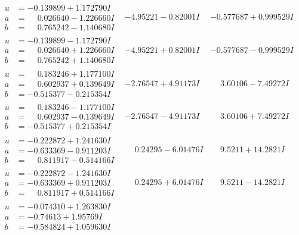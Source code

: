 \documentclass[1p]{elsarticle_modified}
\theoremstyle{definition}
\begin{document}
$$\begin{array}{c|c|c}
\begin{aligned}
u &= -0.139899 + 1.172790 I \\
a &= \phantom{-}0.026640 - 1.226660 I \\
b &= \phantom{-}0.765242 - 1.140680 I\end{aligned}
 & -4.95221 - 0.82001 I & -0.577687 + 0.999529 I \\ \hline\begin{aligned}
u &= -0.139899 - 1.172790 I \\
a &= \phantom{-}0.026640 + 1.226660 I \\
b &= \phantom{-}0.765242 + 1.140680 I\end{aligned}
 & -4.95221 + 0.82001 I & -0.577687 - 0.999529 I \\ \hline\begin{aligned}
u &= \phantom{-}0.183246 + 1.177100 I \\
a &= \phantom{-}0.602937 + 0.139649 I \\
b &= -0.515377 - 0.215354 I\end{aligned}
 & -2.76547 + 4.91173 I & \phantom{-}3.60106 - 7.49272 I \\ \hline\begin{aligned}
u &= \phantom{-}0.183246 - 1.177100 I \\
a &= \phantom{-}0.602937 - 0.139649 I \\
b &= -0.515377 + 0.215354 I\end{aligned}
 & -2.76547 - 4.91173 I & \phantom{-}3.60106 + 7.49272 I \\ \hline\begin{aligned}
u &= -0.222872 + 1.241630 I \\
a &= -0.633369 - 0.911203 I \\
b &= \phantom{-}0.811917 - 0.514166 I\end{aligned}
 & \phantom{-}0.24295 - 6.01476 I & \phantom{-}9.5211 + 14.2821 I \\ \hline\begin{aligned}
u &= -0.222872 - 1.241630 I \\
a &= -0.633369 + 0.911203 I \\
b &= \phantom{-}0.811917 + 0.514166 I\end{aligned}
 & \phantom{-}0.24295 + 6.01476 I & \phantom{-}9.5211 - 14.2821 I \\ \hline\begin{aligned}
u &= -0.074310 + 1.263830 I \\
a &= -0.74613 + 1.95769 I \\
b &= -0.584824 + 1.059630 I\end{aligned}

\end{array}$$
\end{document}
